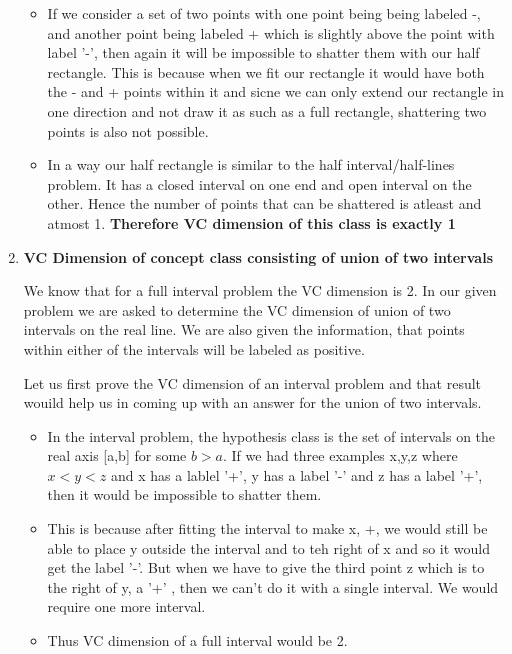 \documentclass[12pt, fullpage,letterpaper]{article}
\begin{document}
\begin{enumerate}
\begin{itemize}
\item If we consider a set of two points with one point being being labeled -,  and another point being labeled + which is slightly above the point with label '-', then again it will be impossible to shatter them with our half rectangle. This is because when we fit our rectangle it would have both the - and + points within it and sicne we can only extend our rectangle in one direction and not draw it as such as a full rectangle, shattering two points is also not possible. 

\item In a way our half  rectangle is similar to the half interval/half-lines problem. It has a closed interval on one end and open interval on the other. Hence the number of points that can be shattered is atleast and atmost 1. \textbf{ Therefore VC dimension of this class is exactly 1}
\end{itemize}

\item \textbf{ VC Dimension of concept class consisting of union of two intervals}

We know that for a full interval problem the VC dimension is 2. In our given problem we are asked to determine the VC dimension of union of two intervals on the real line. We are also given the information, that points within either of the intervals will be labeled as positive.

Let us first prove the VC dimension of an interval problem and that result wouild help us in coming up with an answer for the union of two intervals.

\begin{itemize}
\item In the interval problem, the hypothesis class is the set of intervals on the real axis [a,b] for some $b>a$. If we had three examples x,y,z where $x<y <z$ and x has a lablel '+', y has a label '-' and z has a label '+', then it would be impossible to shatter them. 

\item This is because after fitting the interval to make x, +, we would still be able to place y outside the interval and to teh right of x and so it would get the label '-'. But when we have to give the third point z which is to the right of y, a '+' , then we can't do it with a single interval. We would require one more interval. 

\item Thus VC dimension of a full interval would be 2.


\end{itemize}
\end{enumerate}
\end{document}
